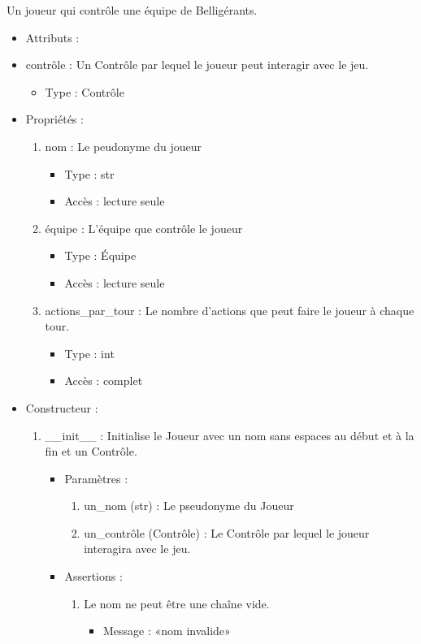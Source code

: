 \documentclass[12pt,pdftex,oneside]{article}
\begin{document}
  Un joueur qui contrôle une équipe de Belligérants.

  \begin{itemize}
  \item Attributs :
    \item contrôle : Un Contrôle par lequel le joueur peut interagir avec le jeu.
          \begin{itemize}
          \item Type : Contrôle
          \end{itemize}

  \item Propriétés : 
    \begin{enumerate}
    \item nom : Le peudonyme du joueur
          \begin{itemize}
          \item Type : str
          \item Accès : lecture seule
          \end{itemize}
    \item équipe : L'équipe que contrôle le joueur
          \begin{itemize}
          \item Type : Équipe
          \item Accès : lecture seule
          \end{itemize}
    \item actions\_par\_tour : Le nombre d'actions que peut faire le joueur à
      chaque tour.
          \begin{itemize}
          \item Type : int
          \item Accès : complet
          \end{itemize}

    \end{enumerate}

  \item Constructeur : 

  \begin{enumerate}
  \item \_\_init\_\_ : Initialise le Joueur avec un nom sans espaces au début et
    à la fin et un Contrôle.
    \begin{itemize}
    \item Paramètres : 
      \begin{enumerate}
      \item un\_nom (str) : Le pseudonyme du Joueur
      \item un\_contrôle (Contrôle) : Le Contrôle par lequel le joueur interagira
        avec le jeu.
      \end{enumerate}
      \item Assertions : 
        \begin{enumerate}
        \item Le nom ne peut être une chaîne vide.
          \begin{itemize}
          \item Message : «nom invalide»
          \end{itemize}
        \end{enumerate}
    \end{itemize}


\end{enumerate}
\end{itemize}
\end{document}
